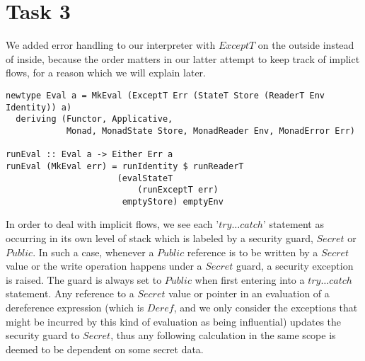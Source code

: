 \documentclass[10pt]{article}
\begin{document}
\section*{Task 3}
We added error handling to our interpreter with $ExceptT$ on the outside instead of inside, because the order matters in our latter attempt to keep track of implict flows, for a reason which we will explain later.
\begin{lstlisting}
newtype Eval a = MkEval (ExceptT Err (StateT Store (ReaderT Env Identity)) a)
  deriving (Functor, Applicative,
            Monad, MonadState Store, MonadReader Env, MonadError Err)

runEval :: Eval a -> Either Err a
runEval (MkEval err) = runIdentity $ runReaderT
                      (evalStateT
                          (runExceptT err)
                       emptyStore) emptyEnv
\end{lstlisting}

In order to deal with implicit flows, we see each '$try \dots catch$' statement as occurring in its own level of stack which is labeled by a security guard, $Secret$ or $Public$.  In such a case, whenever a $Public$ reference is to be written by a $Secret$ value or the write operation happens under a $Secret$ guard, a security exception is raised. The guard is always set to $Public$ when first entering into a $try \dots catch$ statement. Any reference to a $Secret$ value or pointer in an evaluation of a dereference expression (which is $Deref$, and we only consider the exceptions that might be incurred by this kind of evaluation as being influential)  updates the security guard to $Secret$, thus any following calculation in the same scope is deemed to be dependent on some secret data.
\end{document}
